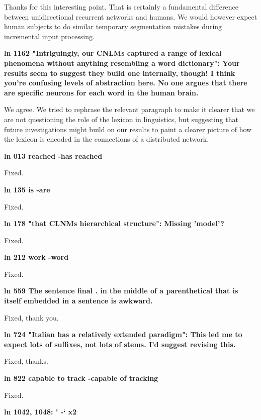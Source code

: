 \documentclass{article}[11pt,a4paper,oneside]
\begin{document}
Thanks for this interesting point. That is certainly a fundamental difference between unidirectional recurrent networks and humans. We would however expect human subjects to do similar temporary segmentation mistakes during incremental input processing.\newline

\textbf{
ln 1162 "Intriguingly, our CNLMs captured a range of lexical phenomena
without anything resembling a word dictionary": Your results seem to
suggest they build one internally, though! I think you’re confusing
levels of abstraction here. No one argues that there are specific
neurons for each word in the human brain.}

We agree. We tried to rephrase the relevant paragraph to make it clearer that we are not questioning the role of the lexicon in linguistics, but suggesting that future investigations might build on our results to paint a clearer picture of how the lexicon is encoded in the connections of a distributed network.\newline

\textbf{
ln 013 reached -has reached}

Fixed.\newline

\textbf{
ln 135 is -are}

Fixed.\newline

\textbf{
ln 178 "that CLNMs hierarchical structure": Missing 'model'?}

Fixed.\newline

\textbf{
ln 212 work -word}

Fixed.\newline

\textbf{
ln 559 The sentence final . in the middle of a parenthetical that is itself
embedded in a sentence is awkward.}

Fixed, thank you.\newline

\textbf{
ln 724 "Italian has a relatively extended paradigm": This led me to expect
lots of suffixes, not lots of stems. I'd suggest revising this.}

Fixed, thanks.\newline

\textbf{
ln 822 capable to track -capable of tracking}

Fixed.\newline

\textbf{
ln 1042, 1048: ' -` x2}
\end{document}

